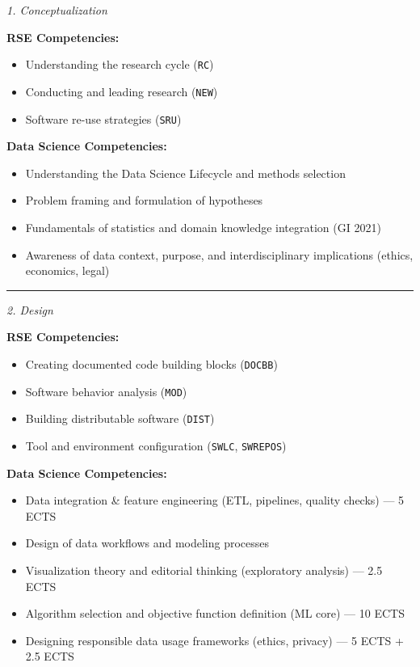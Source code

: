\documentclass[
        english,biblatex
    ]{lni}
\providecommand{\tightlist}{%
    \setlength{\itemsep}{0pt}\setlength{\parskip}{0pt}}
\begin{document}
    \emph{1. Conceptualization}

    \textbf{RSE Competencies:}

    \begin{itemize}
    \tightlist
    \item
      Understanding the research cycle (\texttt{RC})
    \item
      Conducting and leading research (\texttt{NEW})
    \item
      Software re-use strategies (\texttt{SRU})
    \end{itemize}

    \textbf{Data Science Competencies:}

    \begin{itemize}
    \tightlist
    \item
      Understanding the Data Science Lifecycle and methods selection
    \item
      Problem framing and formulation of hypotheses
    \item
      Fundamentals of statistics and domain knowledge integration (GI
      2021)
    \item
      Awareness of data context, purpose, and interdisciplinary
      implications (ethics, economics, legal)
    \end{itemize}

    \begin{center}\rule{0.5\linewidth}{0.5pt}\end{center}

    \emph{2. Design}

    \textbf{RSE Competencies:}

    \begin{itemize}
    \tightlist
    \item
      Creating documented code building blocks (\texttt{DOCBB})
    \item
      Software behavior analysis (\texttt{MOD})
    \item
      Building distributable software (\texttt{DIST})
    \item
      Tool and environment configuration (\texttt{SWLC},
      \texttt{SWREPOS})
    \end{itemize}

    \textbf{Data Science Competencies:}

    \begin{itemize}
    \tightlist
    \item
      Data integration \& feature engineering (ETL, pipelines, quality
      checks) --- 5 ECTS
    \item
      Design of data workflows and modeling processes
    \item
      Visualization theory and editorial thinking (exploratory analysis)
      --- 2.5 ECTS
    \item
      Algorithm selection and objective function definition (ML core)
      --- 10 ECTS
    \item
      Designing responsible data usage frameworks (ethics, privacy) ---
      5 ECTS + 2.5 ECTS
    \end{itemize}
\end{document}
